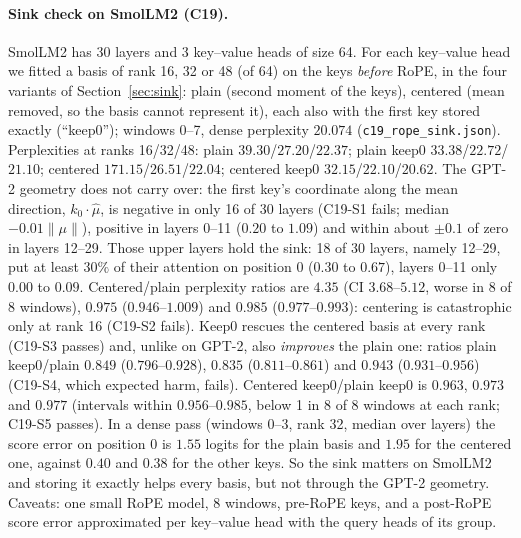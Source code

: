 \documentclass[10pt]{article}
\theoremstyle{plain}
\theoremstyle{definition}
\theoremstyle{remark}
\newcommand{\rl}[1]{\textsf{#1}}%
\begin{document}
\paragraph{Sink check on SmolLM2 (C19).} SmolLM2 has 30 layers and 3 key--value heads of size 64. For each key--value head we fitted a basis of rank 16, 32 or 48 (of 64) on the keys \emph{before} RoPE, in the four variants of Section~\ref{sec:sink}: plain (second moment of the keys), centered (mean removed, so the basis cannot represent it), each also with the first key stored exactly (``keep0''); windows 0--7, dense perplexity $20.074$ (\texttt{c19\_rope\_sink.json}). Perplexities at ranks 16/32/48: plain $39.30$/$27.20$/$22.37$; plain keep0 $33.38$/$22.72$/$21.10$; centered $171.15$/$26.51$/$22.04$; centered keep0 $32.15$/$22.10$/$20.62$. The GPT-2 geometry does not carry over: the first key's coordinate along the mean direction, $k_0\cdot\hat\mu$, is negative in only 16 of 30 layers (\rl{C19-S1} fails; median $-0.01\lVert\mu\rVert$), positive in layers 0--11 ($0.20$ to $1.09$) and within about $\pm0.1$ of zero in layers 12--29. Those upper layers hold the sink: 18 of 30 layers, namely 12--29, put at least $30\%$ of their attention on position 0 ($0.30$ to $0.67$), layers 0--11 only $0.00$ to $0.09$. Centered/plain perplexity ratios are $4.35$ (CI $3.68$--$5.12$, worse in 8 of 8 windows), $0.975$ ($0.946$--$1.009$) and $0.985$ ($0.977$--$0.993$): centering is catastrophic only at rank 16 (\rl{C19-S2} fails). Keep0 rescues the centered basis at every rank (\rl{C19-S3} passes) and, unlike on GPT-2, also \emph{improves} the plain one: ratios plain keep0/plain $0.849$ ($0.796$--$0.928$), $0.835$ ($0.811$--$0.861$) and $0.943$ ($0.931$--$0.956$) (\rl{C19-S4}, which expected harm, fails). Centered keep0/plain keep0 is $0.963$, $0.973$ and $0.977$ (intervals within $0.956$--$0.985$, below 1 in 8 of 8 windows at each rank; \rl{C19-S5} passes). In a dense pass (windows 0--3, rank 32, median over layers) the score error on position 0 is $1.55$ logits for the plain basis and $1.95$ for the centered one, against $0.40$ and $0.38$ for the other keys. So the sink matters on SmolLM2 and storing it exactly helps every basis, but not through the GPT-2 geometry. Caveats: one small RoPE model, 8 windows, pre-RoPE keys, and a post-RoPE score error approximated per key--value head with the query heads of its group.
\end{document}
